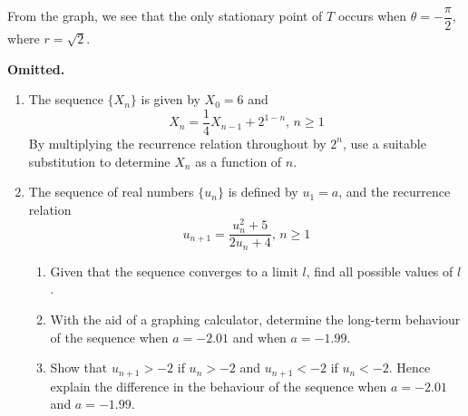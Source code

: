 \documentclass{echw}
\begin{document}
            \noindent From the graph, we see that the only stationary point of $T$ occurs when $\theta = -\dfrac\pi2$, where $r = \sqrt2$.

    \problem{}
        \textbf{Omitted.}

    \problem{}
        \begin{enumerate}
            \item The sequence $\{X_n\}$ is given by $X_0 = 6$ and
            \begin{equation*}
                X_n = \dfrac14 X_{n-1} + 2^{1-n}, \, n \geq 1
            \end{equation*}
            By multiplying the recurrence relation throughout by $2^n$, use a suitable substitution to determine $X_n$ as a function of $n$.
            \item The sequence of real numbers $\{u_n\}$ is defined by $u_1 = a$, and the recurrence relation
            \begin{equation*}
                u_{n+1} = \dfrac{u_n^2 + 5}{2u_n + 4}, \, n \geq 1
            \end{equation*}
            \begin{enumerate}
                \item Given that the sequence converges to a limit $l$, find all possible values of $l$.
                \item With the aid of a graphing calculator, determine the long-term behaviour of the sequence when $a = -2.01$ and when $a = -1.99$.
                \item Show that $u_{n+1} > -2$ if $u_n > -2$ and $u_{n+1} < -2$ if $u_n < -2$. Hence explain the difference in the behaviour of the sequence when $a = -2.01$ and $a = -1.99$.
            \end{enumerate}
        \end{enumerate}

    \solution
\end{document}
